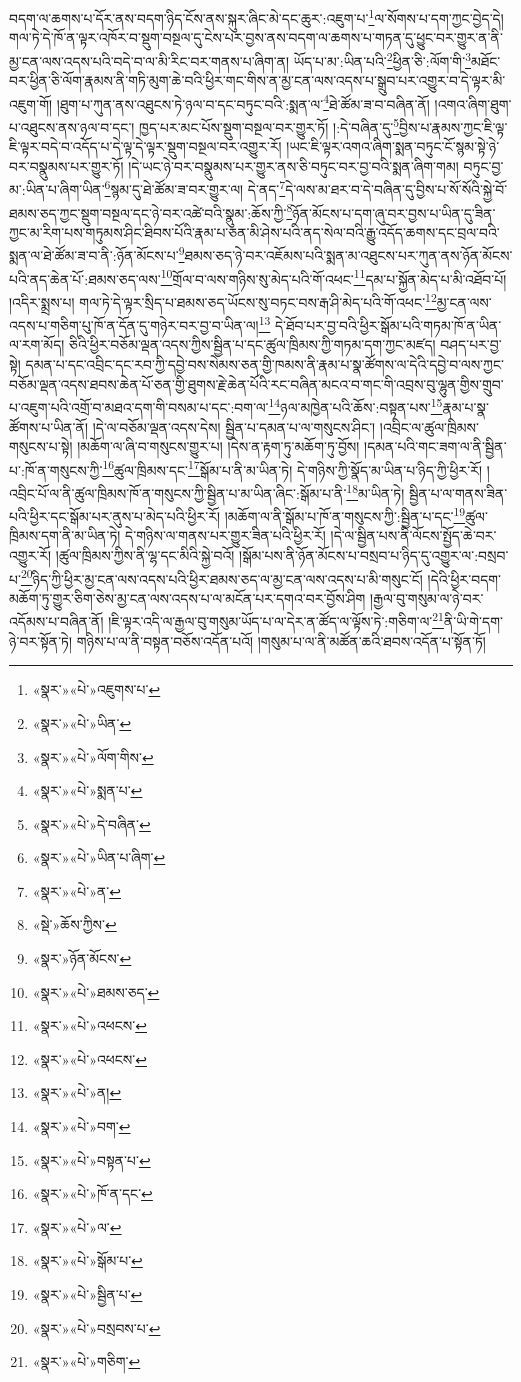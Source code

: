 བདག་ལ་ཆགས་པ་དོར་ནས་བདག་ཉིད་ངོས་ནས་སྐུར་ཞིང་མེ་དང་ཆུར་:འཇུག་པ་\footnote{«སྣར་»«པེ་»འཇུགས་པ་}ལ་སོགས་པ་དག་ཀྱང་བྱེད་དེ། གལ་ཏེ་དེ་ཁོ་ན་ལྟར་འཁོར་བ་སྡུག་བསྔལ་དུ་ངེས་པར་བྱས་ནས་བདག་ལ་ཆགས་པ་གཏན་དུ་ཕྱུང་བར་གྱུར་ན་ནི་མྱ་ངན་ལས་འདས་པའི་བདེ་བ་ལ་མི་རིང་བར་གནས་པ་ཞིག་ན། ཡོད་པ་མ་:ཡིན་པའི་\footnote{«སྣར་»«པེ་»ཡིན་}ཕྱིན་ཅི་:ལོག་གི་\footnote{«སྣར་»«པེ་»ལོག་གིས་}མཐོང་བར་ཕྱིན་ཅི་ལོག་རྣམས་ནི་གཏི་མུག་ཆེ་བའི་ཕྱིར་གང་གིས་ན་མྱ་ངན་ལས་འདས་པ་སྒྲུབ་པར་འགྱུར་བ་དེ་ལྟར་མི་འཇུག་གོ། །ཐུག་པ་ཀུན་ནས་འཐུངས་ཏེ་ཉལ་བ་དང་བཏུང་བའི་:སྨན་ལ་\footnote{«སྣར་»«པེ་»སྨན་པ་}ཐེ་ཚོམ་ཟ་བ་བཞིན་ནོ། །འགའ་ཞིག་ཐུག་པ་འཐུངས་ནས་ཉལ་བ་དང་། ཁྱད་པར་མང་པོས་སྡུག་བསྔལ་བར་གྱུར་ཏོ། །:དེ་བཞིན་དུ་\footnote{«སྣར་»«པེ་»དེ་བཞིན་}བྱིས་པ་རྣམས་ཀྱང་ཇི་ལྟ་ཇི་ལྟར་བདེ་བ་འདོད་པ་དེ་ལྟ་དེ་ལྟར་སྡུག་བསྔལ་བར་འགྱུར་རོ། །ཡང་ཇི་ལྟར་འགའ་ཞིག་སྨན་བཏུང་ངོ་སྙམ་སྟེ་ཉེ་བར་བསྣུམས་པར་གྱུར་ཏོ། །དེ་ཡང་ཉེ་བར་བསྣུམས་པར་གྱུར་ནས་ཅི་བཏུང་བར་བྱ་བའི་སྨན་ཞིག་གམ། བཏུང་བྱ་མ་:ཡིན་པ་ཞིག་ཡིན་\footnote{«སྣར་»«པེ་»ཡིན་པ་ཞིག་}སྙམ་དུ་ཐེ་ཚོམ་ཟ་བར་གྱུར་ལ། དེ་ནད་\footnote{«སྣར་»«པེ་»ན་}དེ་ལས་མ་ཐར་བ་དེ་བཞིན་དུ་བྱིས་པ་སོ་སོའི་སྐྱེ་བོ་ཐམས་ཅད་ཀྱང་སྡུག་བསྔལ་དང་ཉེ་བར་འཚེ་བའི་སྣུམ་:ཆོས་ཀྱི་\footnote{«སྡེ་»ཆོས་ཀྱིས་}ཉོན་མོངས་པ་དག་ཞུ་བར་བྱས་པ་ཡིན་དུ་ཟིན་ཀྱང་མ་རིག་པས་གཏུམས་ཤིང་ཐིབས་པོའི་རྣམ་པ་ཅན་མི་ཤེས་པའི་ནད་སེལ་བའི་རྒྱུ་འདོད་ཆགས་དང་བྲལ་བའི་སྨན་ལ་ཐེ་ཚོམ་ཟ་བ་ནི་:ཉོན་མོངས་པ་\footnote{«སྣར་»ཉོན་མོངས་}ཐམས་ཅད་ཉེ་བར་འཇོམས་པའི་སྨན་མ་འཐུངས་པར་ཀུན་ནས་ཉོན་མོངས་པའི་ནད་ཆེན་པོ་:ཐམས་ཅད་ལས་\footnote{«སྣར་»«པེ་»ཐམས་ཅད་}གྲོལ་བ་ལས་གཉིས་སུ་མེད་པའི་གོ་འཕང་\footnote{«སྣར་»«པེ་»འཕངས་}དམ་པ་སྐྱོན་མེད་པ་མི་འཐོབ་པོ། །འདིར་སྨྲས་པ། གལ་ཏེ་དེ་ལྟར་སྲིད་པ་ཐམས་ཅད་ཡོངས་སུ་བཏང་བས་རྒ་ཤི་མེད་པའི་གོ་འཕང་\footnote{«སྣར་»«པེ་»འཕངས་}མྱ་ངན་ལས་འདས་པ་གཅིག་པུ་ཁོ་ན་དོན་དུ་གཉེར་བར་བྱ་བ་ཡིན་ལ།\footnote{«སྣར་»«པེ་»ན།} དེ་ཐོབ་པར་བྱ་བའི་ཕྱིར་སྒོམ་པའི་གཏམ་ཁོ་ན་ཡིན་ལ་རག་མོད། ཅིའི་ཕྱིར་བཅོམ་ལྡན་འདས་ཀྱིས་སྦྱིན་པ་དང་ཚུལ་ཁྲིམས་ཀྱི་གཏམ་དག་ཀྱང་མཛད། བཤད་པར་བྱ་སྟེ། དམན་པ་དང་འབྲིང་དང་རབ་ཀྱི་དབྱེ་བས་སེམས་ཅན་གྱི་ཁམས་ནི་རྣམ་པ་སྣ་ཚོགས་ལ་དེའི་དབྱེ་བ་ལས་ཀྱང་བཅོམ་ལྡན་འདས་ཐབས་ཆེན་པོ་ཅན་གྱི་ཐུགས་རྗེ་ཆེན་པོའི་རང་བཞིན་མངའ་བ་གང་གི་འབྲས་བུ་ལྷུན་གྱིས་གྲུབ་པ་འཇུག་པའི་འགྲོ་བ་མཐའ་དག་གི་བསམ་པ་དང་:བག་ལ་\footnote{«སྣར་»«པེ་»བག་}ཉལ་མཁྱེན་པའི་ཆོས་:བསྟན་པས་\footnote{«སྣར་»«པེ་»བསྟན་པ་}རྣམ་པ་སྣ་ཚོགས་པ་ཡིན་ནོ། །དེ་ལ་བཅོམ་ལྡན་འདས་དེས། སྦྱིན་པ་དམན་པ་ལ་གསུངས་ཤིང་། །འབྲིང་ལ་ཚུལ་ཁྲིམས་གསུངས་པ་སྟེ། །མཆོག་ལ་ཞི་བ་གསུངས་གྱུར་པ། །དེས་ན་རྟག་ཏུ་མཆོག་ཏུ་བྱོས། །དམན་པའི་གང་ཟག་ལ་ནི་སྦྱིན་པ་:ཁོ་ན་གསུངས་ཀྱི་\footnote{«སྣར་»«པེ་»ཁོ་ན་དང་}ཚུལ་ཁྲིམས་དང་\footnote{«སྣར་»«པེ་»ལ་}སྒོམ་པ་ནི་མ་ཡིན་ཏེ། དེ་གཉིས་ཀྱི་སྣོད་མ་ཡིན་པ་ཉིད་ཀྱི་ཕྱིར་རོ། །འབྲིང་པོ་ལ་ནི་ཚུལ་ཁྲིམས་ཁོ་ན་གསུངས་ཀྱི་སྦྱིན་པ་མ་ཡིན་ཞིང་:སྒོམ་པ་ནི་\footnote{«སྣར་»«པེ་»སྒོམ་པ་}མ་ཡིན་ཏེ། སྦྱིན་པ་ལ་གནས་ཟིན་པའི་ཕྱིར་དང་སྒོམ་པར་ནུས་པ་མེད་པའི་ཕྱིར་རོ། །མཆོག་ལ་ནི་སྒོམ་པ་ཁོ་ན་གསུངས་ཀྱི་:སྦྱིན་པ་དང་\footnote{«སྣར་»«པེ་»སྦྱིན་པ་}ཚུལ་ཁྲིམས་དག་ནི་མ་ཡིན་ཏེ། དེ་གཉིས་ལ་གནས་པར་གྱུར་ཟིན་པའི་ཕྱིར་རོ། །དེ་ལ་སྦྱིན་པས་ནི་ལོངས་སྤྱོད་ཆེ་བར་འགྱུར་རོ། །ཚུལ་ཁྲིམས་ཀྱིས་ནི་ལྷ་དང་མིའི་སྐྱེ་བའོ། །སྒོམ་པས་ནི་ཉོན་མོངས་པ་བསྲབ་པ་ཉིད་དུ་འགྱུར་ལ་:བསྲབ་པ་\footnote{«སྣར་»«པེ་»བསྲབས་པ་}ཉིད་ཀྱི་ཕྱིར་མྱ་ངན་ལས་འདས་པའི་ཕྱིར་ཐམས་ཅད་ལ་མྱ་ངན་ལས་འདས་པ་མི་གསུང་ངོ། །དེའི་ཕྱིར་བདག་མཆོག་ཏུ་གྱུར་ཅིག་ཅེས་མྱ་ངན་ལས་འདས་པ་ལ་མངོན་པར་དགའ་བར་བྱོས་ཤིག །རྒྱལ་བུ་གསུམ་ལ་ཉེ་བར་འདོམས་པ་བཞིན་ནོ། །ཇི་ལྟར་འདི་ལ་རྒྱལ་བུ་གསུམ་ཡོད་པ་ལ་དེར་ན་ཚོད་ལ་ལྟོས་ཏེ་:གཅིག་ལ་\footnote{«སྣར་»«པེ་»གཅིག་}ནི་ཡི་གེ་དག་ཉེ་བར་སྟོན་ཏེ། གཉིས་པ་ལ་ནི་བསྟན་བཅོས་འདོན་པའོ། །གསུམ་པ་ལ་ནི་མཚོན་ཆའི་ཐབས་འདོན་པ་སྟོན་ཏོ། 